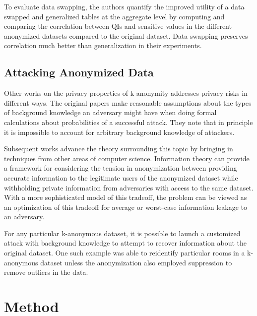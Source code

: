 To evaluate data swapping\cite{soriaSwapping}, the authors quantify the improved utility of a data swapped and generalized tables at the aggregate level by computing and comparing the correlation between QIs and sensitive values in the different anonymized datasets compared to the original dataset. Data swapping preserves correlation much better than generalization in their experiments.

\subsection{Attacking Anonymized Data}
Other works on the privacy properties of k-anonymity addresses privacy risks in different ways. The original papers make reasonable assumptions about the types of background knowledge an adversary might have when doing formal calculations about probabilities of a successful attack. They note that in principle it is impossible to account for arbitrary background knowledge of attackers.

Subsequent works advance the theory surrounding this topic by bringing in techniques from other areas of computer science. Information theory can provide a framework for considering the tension in anonymization between providing accurate information to the legitimate users of the anonymized dataset while withholding private information from adversaries with access to the same dataset\cite{liuInfoTheory}. With a more sophisticated model of this tradeoff, the problem can be viewed as an optimization of this tradeoff for average or worst-case information leakage to an adversary\cite{duInfoTheory}.

For any particular k-anonymous dataset, it is possible to launch a customized attack with background knowledge to attempt to recover information about the original dataset. One such example \cite{schweeEval} was able to reidentify particular rooms in a k-anonymous dataset unless the anonymization also employed suppression to remove outliers in the data.

\section{Method}

